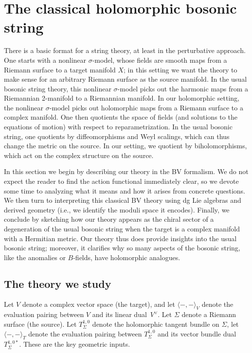 \section{The classical holomorphic bosonic string}


There is a basic format for a string theory, at least in the perturbative approach. 
One starts with a nonlinear $\sigma$-model, 
whose fields are smooth maps from a Riemann surface to a target manifold $X$;
in this setting we want the theory to make sense for an arbitrary Riemann surface as the source manifold.
In the usual bosonic string theory, 
this nonlinear $\sigma$-model picks out the harmonic maps from a Riemannian 2-manifold to a Riemannian manifold.
In our holomorphic setting,
the nonlinear $\sigma$-model picks out holomorphic maps from a Riemann surface to a complex manifold.
One then quotients the space of fields (and solutions to the equations of motion) with respect to reparametrization.
In the usual bosonic string,
one quotients by diffeomorphisms and Weyl scalings, which can thus change the metric on the source.
In our setting, we quotient by biholomorphisms, which act on the complex structure on the source.

In this section we begin by describing our theory in the BV formalism.
We do not expect the reader to find the action functional immediately clear,
so we devote some time to analyzing what it means and how it arises from concrete questions.
We then turn to interpreting this classical BV theory using dg Lie algebras and derived geometry
(i.e., we identify the moduli space it encodes).
Finally, we conclude by sketching how our theory appears as the chiral sector of a degeneration of the usual bosonic string when the target is a complex manifold with a Hermitian metric.
Our theory thus does provide insights into the usual bosonic string;
moreover, it clarifies why so many aspects of the bosonic string,
like the anomalies or $B$-fields, 
have holomorphic analogues.

\subsection{The theory we study} 

Let $V$ denote a complex vector space (the target),
and let $\langle-,-\rangle_V$ denote the evaluation pairing between $V$ and its linear dual~$V^\vee$.
Let $\Sigma$ denote a Riemann surface (the source).
Let $T_\Sigma^{1,0}$ denote the holomorphic tangent bundle on $\Sigma$, 
let $\langle-,-\rangle_T$ denote the evaluation pairing between $T_\Sigma^{1,0}$ and its vector bundle dual~$T_\Sigma^{1,0*}$. 
These are the key geometric inputs.

